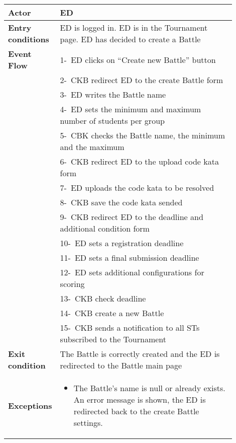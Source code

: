 \begin{center}
    \begin{longtable}{|l|p{0.9\linewidth}|}
        \hline
        \textbf{Actor}            & ED                                                                                                                                                                                       \\
        \hline
        \textbf{Entry conditions} & ED is logged in. ED is in the Tournament page. ED has decided to create a Battle        \\
        \hline
        \textbf{Event Flow}       & 1-\ ED clicks on “Create new Battle” button        \\
        & 2-\ CKB redirect ED to the create Battle form        \\
        & 3-\ ED writes the Battle name        \\
        & 4-\ ED sets the minimum and maximum number of students per group        \\
        & 5-\ CBK checks the Battle name, the minimum and the maximum        \\
        & 6-\ CKB redirect ED to the upload code kata form        \\
        & 7-\ ED uploads the code kata to be resolved        \\
        & 8-\ CKB save the code kata sended        \\
        & 9-\ CKB redirect ED to the deadline and additional condition form        \\
        & 10-\ ED sets a registration deadline        \\
        & 11-\ ED sets a final submission deadline        \\
        & 12-\ ED sets additional configurations for scoring        \\
        & 13-\ CKB check deadline         \\
        & 14-\ CKB create a new Battle        \\
        & 15-\ CKB sends a notification to all STs subscribed to the Tournament         \\
        \hline
        \textbf{Exit condition}   & The Battle is correctly created and the ED is redirected to the Battle main page        \\
        \hline
        \textbf{Exceptions}        & \begin{itemize}
                \item The Battle’s name is null or already exists. An error message is shown, the ED is redirected back to the create Battle settings.

\end{itemize}
\end{longtable}
\end{center}
